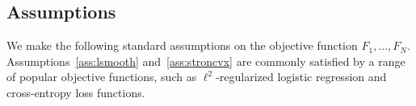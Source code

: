 




\subsection{Assumptions}
\label{sec:assumptions}
We make the following standard assumptions on the objective function $F_1,\dots, F_N$. Assumptions~\ref{ass:lsmooth} and~\ref{ass:stroncvx} are commonly satisfied by a range of popular objective functions, such as $\ell^{2}$-regularized logistic regression and cross-entropy loss functions.

